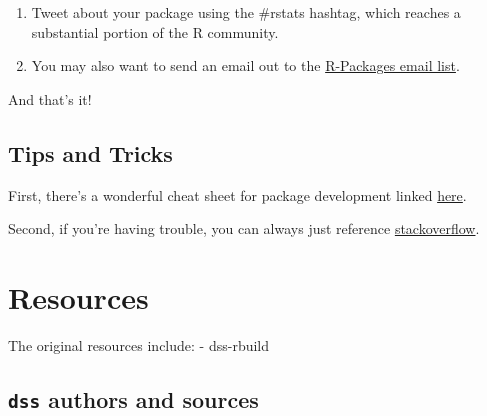 \documentclass[
]{book}
\providecommand{\tightlist}{%
  \setlength{\itemsep}{0pt}\setlength{\parskip}{0pt}}
\begin{document}
\begin{enumerate}
\def\labelenumi{\arabic{enumi}.}
\tightlist
\item
  Tweet about your package using the \#rstats hashtag, which reaches a substantial portion of the R community.
\item
  You may also want to send an email out to the \href{https://stat.ethz.ch/mailman/listinfo/r-packages}{R-Packages email list}.
\end{enumerate}

And that's it!

\hypertarget{tips-and-tricks-1}{%
\section{Tips and Tricks}\label{tips-and-tricks-1}}

First, there's a wonderful cheat sheet for package development linked \href{https://www.rstudio.com/wp-content/uploads/2015/06/devtools-cheatsheet.pdf}{here}.

Second, if you're having trouble, you can always just reference \href{https://stackoverflow.com/questions/tagged/r}{stackoverflow}.

\hypertarget{resources}{%
\chapter{Resources}\label{resources}}

The original resources include:
- dss-rbuild

\hypertarget{dss-authors-and-sources}{%
\section{\texorpdfstring{\texttt{dss} authors and sources}{dss authors and sources}}\label{dss-authors-and-sources}}
\end{document}
